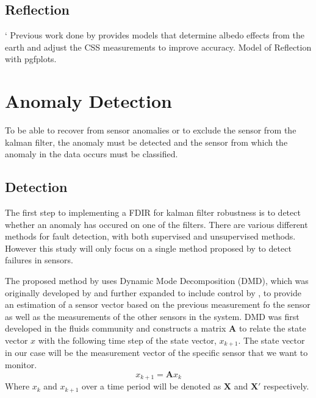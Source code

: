 \documentclass[letterpaper, 10 pt, conference]{ieeeconf}  %
\begin{document}
\subsection{Reflection}`
Previous work done by \textcite{Cilden-Guler2021} provides models that determine albedo effects from the earth and adjust the CSS measurements to improve accuracy.
Model of Reflection with pgfplots.

\section{Anomaly Detection}
To be able to recover from sensor anomalies or to exclude the sensor from the kalman filter, the anomaly must be detected and the sensor from which the anomaly in the data occurs must be classified.

\subsection{Detection}
The first step to implementing a FDIR for kalman filter robustness is to detect whether an anomaly has occured on one of the filters. There are various different methods for fault detection, with both supervised and unsupervised methods. However this study will only focus on a single method proposed by \textcite{DeSilva2020} to detect failures in sensors.

The proposed method by \textcite{DeSilva2020} uses Dynamic Mode Decomposition (DMD), which was originally developed by \textcite{schmid2011applications} and further expanded to include control by \textcite{proctor2016dynamic}, to provide an estimation of a sensor vector based on the previous measurement fo the sensor as well as the measurements of the other sensors in the system. DMD was first developed in the fluids community and constructs a matrix $\mathbf{A}$ to relate the state vector $x$ with the following time step of the state vector, $x_{k+1}$. The state vector in our case will be the measurement vector of the specific sensor that we want to monitor.
\begin{equation}
	x_{k+1} = \mathbf{A}x_k
\end{equation}
Where $x_k$ and $x_{k+1}$ over a time period will be denoted as $\mathbf{X}$ and $\mathbf{X'}$ respectively.
\end{document}
